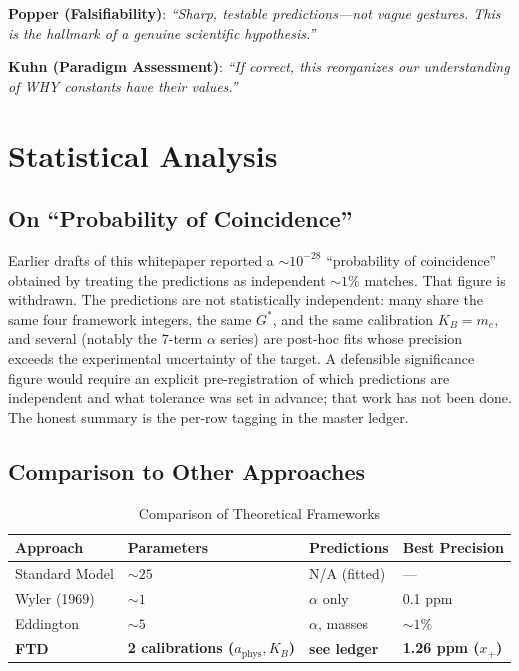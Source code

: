 \documentclass[11pt,a4paper]{article}
\begin{document}
\textbf{Popper (Falsifiability)}: \textit{``Sharp, testable predictions---not vague gestures. This is the hallmark of a genuine scientific hypothesis.''}

\textbf{Kuhn (Paradigm Assessment)}: \textit{``If correct, this reorganizes our understanding of WHY constants have their values.''}

\section{Statistical Analysis}

\subsection{On ``Probability of Coincidence''}

Earlier drafts of this whitepaper reported a $\sim 10^{-28}$ ``probability of coincidence'' obtained by treating the predictions as independent $\sim 1\%$ matches. That figure is withdrawn. The predictions are not statistically independent: many share the same four framework integers, the same $G^*$, and the same calibration $K_B = m_e$, and several (notably the 7-term $\alpha$ series) are post-hoc fits whose precision exceeds the experimental uncertainty of the target. A defensible significance figure would require an explicit pre-registration of which predictions are independent and what tolerance was set in advance; that work has not been done. The honest summary is the per-row tagging in the master ledger.

\subsection{Comparison to Other Approaches}

\begin{table}[H]
\centering
\caption{Comparison of Theoretical Frameworks}
\begin{tabular}{llll}
\toprule
\textbf{Approach} & \textbf{Parameters} & \textbf{Predictions} & \textbf{Best Precision} \\
\midrule
Standard Model & $\sim 25$ & N/A (fitted) & --- \\
Wyler (1969) & $\sim 1$ & $\alpha$ only & 0.1 ppm \\
Eddington & $\sim 5$ & $\alpha$, masses & $\sim 1\%$ \\
\textbf{FTD} & \textbf{2 calibrations ($a_{\text{phys}}, K_B$)} & \textbf{see ledger} & \textbf{1.26 ppm ($x_+$)} \\
\bottomrule
\end{tabular}
\end{table}
\end{document}
